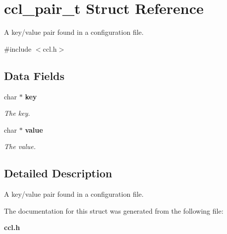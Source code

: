 \section{ccl\_\-pair\_\-t Struct Reference}
\label{structccl__pair__t}


A key/value pair found in a configuration file.  


{\ttfamily \#include $<$ccl.h$>$}\subsection*{Data Fields}
\begin{DoxyCompactItemize}
\item 
char $\ast$ {\bf key}\label{structccl__pair__t_a63cd442d0715af3edd653967c997fa59}

\begin{DoxyCompactList}\small\item\em The key. \item\end{DoxyCompactList}\item 
char $\ast$ {\bf value}\label{structccl__pair__t_a8c51e3b6ad4537b3aa1f5b71a12968ee}

\begin{DoxyCompactList}\small\item\em The value. \item\end{DoxyCompactList}\end{DoxyCompactItemize}


\subsection{Detailed Description}
A key/value pair found in a configuration file. 

The documentation for this struct was generated from the following file:\begin{DoxyCompactItemize}
\item 
{\bf ccl.h}\end{DoxyCompactItemize}
